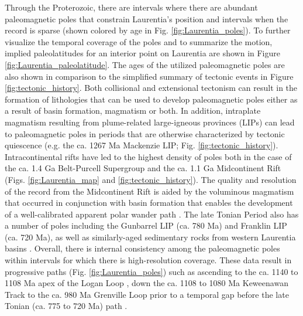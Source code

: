\documentclass[twocolumn, switch]{article} %
\begin{document}
Through the Proterozoic, there are intervals where there are abundant paleomagnetic poles that constrain Laurentia's position and intervals when the record is sparse (shown colored by age in Fig. \ref{fig:Laurentia_poles}). To further visualize the temporal coverage of the poles and to summarize the motion, implied paleolatitudes for an interior point on Laurentia are shown in Figure \ref{fig:Laurentia_paleolatitude}. The ages of the utilized paleomagnetic poles are also shown in comparison to the simplified summary of tectonic events in Figure \ref{fig:tectonic_history}. Both collisional and extensional tectonism can result in the formation of lithologies that can be used to develop paleomagnetic poles either as a result of basin formation, magmatism or both. In addition, intraplate magmatism resulting from plume-related large-igneous provinces (LIPs) can lead to paleomagnetic poles in periods that are otherwise characterized by tectonic quiescence (e.g. the ca. 1267 Ma Mackenzie LIP; Fig. \ref{fig:tectonic_history}). Intracontinental rifts have led to the highest density of poles both in the case of the ca. 1.4 Ga Belt-Purcell Supergroup and the ca. 1.1 Ga Midcontinent Rift (Figs. \ref{fig:Laurentia_map} and \ref{fig:tectonic_history}). The quality and resolution of the record from the Midcontinent Rift is aided by the voluminous magmatism that occurred in conjunction with basin formation that enables the development of a well-calibrated apparent polar wander path \citep{Swanson-Hysell2019a}. The late Tonian Period also has a number of poles including the Gunbarrel LIP (ca. 780 Ma) and Franklin LIP (ca. 720 Ma), as well as similarly-aged sedimentary rocks from western Laurentia basins \citep{Eyster2020a}. Overall, there is internal consistency among the paleomagnetic poles within intervals for which there is high-resolution coverage. These data result in progressive paths (Fig. \ref{fig:Laurentia_poles}) such as ascending to the ca. 1140 to 1108 Ma apex of the Logan Loop \citep{Robertson1971a}, down the ca. 1108 to 1080 Ma Keweenawan Track \citep{Swanson-Hysell2019a} to the ca. 980 Ma Grenville Loop \citep{McWilliams1975a} prior to a temporal gap before the late Tonian (ca. 775 to 720 Ma) path \citep{Eyster2020a}.
\end{document}
